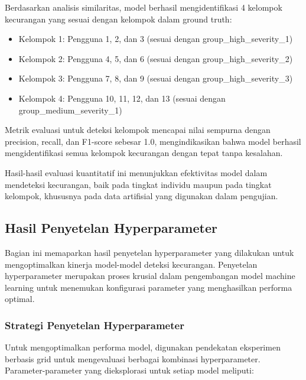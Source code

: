 Berdasarkan analisis similaritas, model berhasil mengidentifikasi 4 kelompok kecurangan yang sesuai dengan kelompok dalam ground truth:
\begin{itemize}
    \item Kelompok 1: Pengguna 1, 2, dan 3 (sesuai dengan group\_high\_severity\_1)
    \item Kelompok 2: Pengguna 4, 5, dan 6 (sesuai dengan group\_high\_severity\_2)
    \item Kelompok 3: Pengguna 7, 8, dan 9 (sesuai dengan group\_high\_severity\_3)
    \item Kelompok 4: Pengguna 10, 11, 12, dan 13 (sesuai dengan group\_medium\_severity\_1)
\end{itemize}

Metrik evaluasi untuk deteksi kelompok mencapai nilai sempurna dengan precision, recall, dan F1-score sebesar 1.0, mengindikasikan bahwa model berhasil mengidentifikasi semua kelompok kecurangan dengan tepat tanpa kesalahan.

Hasil-hasil evaluasi kuantitatif ini menunjukkan efektivitas model dalam mendeteksi kecurangan, baik pada tingkat individu maupun pada tingkat kelompok, khususnya pada data artifisial yang digunakan dalam pengujian.

\subsection{Hasil Penyetelan Hyperparameter}
\label{subsec:hasilPenyetelanHyperparameter}

Bagian ini memaparkan hasil penyetelan hyperparameter yang dilakukan untuk mengoptimalkan kinerja model-model deteksi kecurangan. Penyetelan hyperparameter merupakan proses krusial dalam pengembangan model machine learning untuk menemukan konfigurasi parameter yang menghasilkan performa optimal.

\subsubsection{Strategi Penyetelan Hyperparameter}

Untuk mengoptimalkan performa model, digunakan pendekatan eksperimen berbasis grid untuk mengevaluasi berbagai kombinasi hyperparameter. Parameter-parameter yang dieksplorasi untuk setiap model meliputi:

